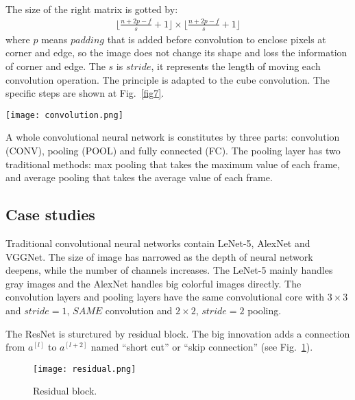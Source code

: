 \documentclass[a4paper]{article}
\begin{document}
The size of the right matrix is gotted by:
\begin{gather}
\lfloor \frac{n + 2p - f}{s} + 1 \rfloor \times \lfloor\frac{n + 2p - f}{s} + 1 \rfloor
\end{gather}
where $p$ means $padding$ that is added before convolution to enclose pixels at corner and edge, so the image does not change its shape and loss the information of corner and edge. The $s$ is $stride$, it represents the length of moving each convolution operation. The principle is adapted to the cube convolution. The specific steps are shown at Fig.~\ref{fig7}.

\begin{figure*}
\begin{center}
\texttt{[image: convolution.png]}
\end{center}
\caption{Example ConvNet.}
\label{fig7}
\end{figure*}

A whole convolutional neural network is constitutes by three parts: convolution (CONV), pooling (POOL) and fully connected (FC). The pooling layer has two traditional methods: max pooling that takes the maximum value of each frame, and average pooling that takes the average value of each frame.

\subsection{Case studies}

Traditional convolutional neural networks contain LeNet-5, AlexNet and VGGNet. 
The size of image has narrowed as the depth of neural network deepens, while the number of channels increases. The LeNet-5 mainly handles gray images and the AlexNet handles big colorful images directly. The convolution layers and pooling layers have the same convolutional core with $3\times 3$ and $stride = 1$, $SAME$ convolution and $2 \times 2$, $stride = 2$ pooling.

The ResNet is sturctured by residual block. The big innovation adds a connection from $a^{[l]}$ to $a^{[l+2]}$ named ``short cut'' or ``skip connection'' (see Fig.~\ref{fig8}).

\begin{figure}
\begin{center}
\texttt{[image: residual.png]}
\end{center}
\caption{Residual block.}
\label{fig8}
\end{figure}
\end{document}
